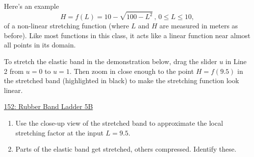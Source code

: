 \documentclass{ximera}
\begin{document}
\begin{example} \label{Ex:JDJFHDtet434t}
Here's an example
\[
      H = f(L) = 10 - \sqrt{100-L^2} \, , \, 0\leq L \leq 10,
\] 
of a non-linear stretching function (where $L$ and $H$ are measured in meters as before). Like most functions in this class, it acts like a linear function near almost all points in its domain. 

To stretch the elastic band in the demonstration below, drag the slider $u$ in Line 2 from $u=0$ to $u=1$. Then zoom in close enough to the point $H=f(9.5)$ in the stretched band (highlighted in black) to make the stretching function look linear. %


\begin{onlineOnly}
    \begin{center}
\end{center}
\end{onlineOnly}

\href{https://www.desmos.com/calculator/xk8dvcfgwi}{152: Rubber Band Ladder 5B}


\begin{enumerate}

\item Use the close-up view of the stretched band to approximate the local stretching factor at the input $L=9.5$.


\item Parts of the elastic band get stretched, others compressed. Identify these.
\end{enumerate}






\end{example}
\end{document}
